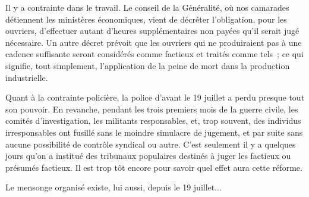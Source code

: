 \documentclass[french,twoside]{book} %
\begin{document}
Il y a contrainte dans le travail. Le conseil de la Généralité, où nos camarades détiennent les ministères économiques, vient de décréter l'obli­gation, pour les ouvriers, d'effectuer autant d'heures supplémentaires non payées qu'il serait jugé nécessaire. Un autre décret prévoit que les ouvriers qui ne produiraient pas à une cadence suffisante seront considérés comme factieux et traités comme tels ; ce qui signifie, tout simplement, l'application de la peine de mort dans la production industrielle.\par
Quant à la contrainte policière, la police d'avant le 19 juillet a perdu presque tout son pouvoir. En revanche, pendant les trois premiers mois de la guerre civile, les comités d'investigation, les militants responsables, et, trop souvent, des individus irresponsables ont fusillé sans le moindre simulacre de jugement, et par suite sans aucune possibilité de contrôle syndical ou autre. C'est seulement il y a quelques jours qu'on a institué des tribunaux populaires destinés à juger les factieux ou présumés factieux. Il est trop tôt encore pour savoir quel effet aura cette réforme.\par
Le mensonge organisé existe, lui aussi, depuis le 19 juillet...\par

\begin{center}
\noindent \centerline{}
\end{center}
\end{document}
